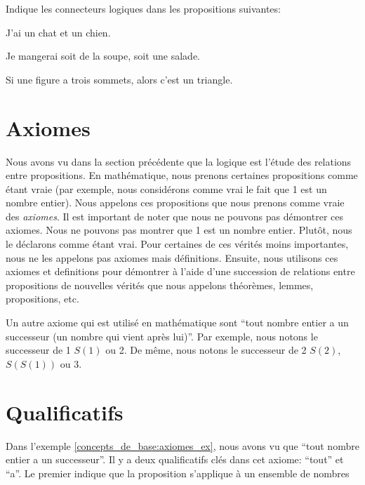 \begin{exercicefr}
    Indique les connecteurs logiques dans les propositions suivantes:
    \begin{exerciceenumnoeq}
        \item J'ai un chat et un chien.
        \item Je mangerai soit de la soupe, soit une salade.
        \item Si une figure a trois sommets, alors c'est un triangle.
    \end{exerciceenumnoeq}
\end{exercicefr}

\section{Axiomes}

Nous avons vu dans la section précédente que la logique est l'étude des relations entre propositions. En mathématique, nous prenons certaines propositions comme étant vraie (par exemple, nous considérons comme vrai le fait que 1 est un nombre entier). Nous appelons ces propositions que nous prenons comme vraie des {\em axiomes}. Il est important de noter que nous ne pouvons pas démontrer ces axiomes. Nous ne pouvons pas montrer que 1 est un nombre entier. Plutôt, nous le déclarons comme étant vrai. Pour certaines de ces vérités moins importantes, nous ne les appelons pas axiomes mais définitions. Ensuite, nous utilisons ces axiomes et definitions pour démontrer à l'aide d'une succession de relations entre propositions de nouvelles vérités que nous appelons théorèmes, lemmes, propositions, etc.

\begin{exemple}\label{concepts_de_base:axiomes_ex}
    Un autre axiome qui est utilisé en mathématique sont ``tout nombre entier a un successeur (un nombre qui vient après lui)''. Par exemple, nous notons le successeur de 1 $S(1)$ ou 2. De même, nous notons le successeur de 2 $S(2)$, $S(S(1))$ ou 3.
\end{exemple}

\section{Qualificatifs}

Dans l'exemple \ref{concepts_de_base:axiomes_ex}, nous avons vu que ``tout nombre entier a un successeur''. Il y a deux qualificatifs clés dans cet axiome: ``tout'' et ``a''. Le premier indique que la proposition s'applique à un ensemble de nombres